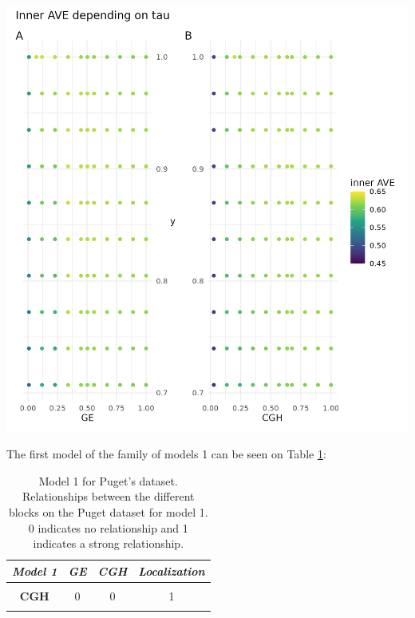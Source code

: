 \documentclass[
  12pt,
  a4paper,
  twoside,
  openright]{book}
\let\origfigure\figure
\let\endorigfigure\endfigure
\renewenvironment{figure}[1][2] {
    \expandafter\origfigure\expandafter[!ht]
} {
    \endorigfigure
}
\begin{document}
\begin{figure}
\includegraphics[width=1\linewidth]{images/pugets_tau_to_AVE} \caption[Effect of tau on the inner AVE on Puget's dataset.]{Effect of tau on the inner AVE on Puget's dataset. The suggested tau value is the column between the regular grid, on the ordinate axis the y's tau values and on the abscissa the gene expression (GE) on the left and the comparative genomic hybridization (CGH) on the right. The highest inner AVE is with high tau values for y and middle to upper values for GE and CGH.}\label{fig:puget-tau2AVE}
\end{figure}

The first model of the family of models 1 can be seen on Table \ref{tab:puget-model1}:

\begin{table}[H]

\caption[Model 1 for Puget's dataset.]{\label{tab:puget-model1}Model 1 for Puget's dataset. Relationships between the different blocks on the Puget dataset for model 1. 0 indicates no relationship and 1 indicates a strong relationship.}
\centering
\begin{tabular}[t]{|>{}c|c|c|>{}c|}
\hline
\em{\textbf{Model 1}} & \em{\textbf{GE}} & \em{\textbf{CGH}} & \em{\textbf{Localization}}\\
\hline
\textbf{\cellcolor{gray!6}{GE}} & \cellcolor{gray!6}{0} & \cellcolor{gray!6}{0} & \cellcolor{gray!6}{1}\\
\hline
\textbf{CGH} & 0 & 0 & 1\\
\hline
\textbf{\cellcolor{gray!6}{Localization}} & \cellcolor{gray!6}{1} & \cellcolor{gray!6}{1} & \cellcolor{gray!6}{0}\\
\hline
\end{tabular}
\end{table}
\end{document}
